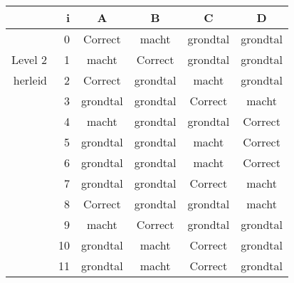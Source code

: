 \begin{tabular}{ rr| c|c|c|c}\hline\hline
     & i & \textbf{A} & \textbf{B} & \textbf{C} & \textbf{D}\\\hline

&0&Correct\cellcolor[gray]{0.6}&macht&grondtal&grondtal\\
Level 2 & 1&macht&Correct\cellcolor[gray]{0.6}&grondtal&grondtal\\
herleid &2&Correct\cellcolor[gray]{0.6}&grondtal&macht&grondtal\\
&3&grondtal&grondtal&Correct\cellcolor[gray]{0.6}&macht\\
&4&macht&grondtal&grondtal&Correct\cellcolor[gray]{0.6}\\
&5&grondtal&grondtal&macht&Correct\cellcolor[gray]{0.6}\\
&6&grondtal&grondtal&macht&Correct\cellcolor[gray]{0.6}\\
&7&grondtal&grondtal&Correct\cellcolor[gray]{0.6}&macht\\
&8&Correct\cellcolor[gray]{0.6}&grondtal&grondtal&macht\\
&9&macht&Correct\cellcolor[gray]{0.6}&grondtal&grondtal\\
&10&grondtal&macht&Correct\cellcolor[gray]{0.6}&grondtal\\
&11&grondtal&macht&Correct\cellcolor[gray]{0.6}&grondtal\\
\hline\end{tabular}\par\ \newline

